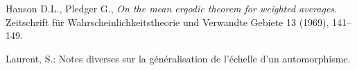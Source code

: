 \documentclass[12pt,a4paper]{article}
\begin{document}
\begin{thebibliography}{99.}

Hanson D.L., Pledger G.,
\emph{On the mean ergodic theorem for weighted averages}. 
Zeitschrift für Wahrscheinlichkeitstheorie und Verwandte Gebiete 13 (1969), 141--149.

Laurent, S.: 
Notes diverses sur la généralisation de l'échelle d'un automorphisme. 


\end{thebibliography}
\end{document}
